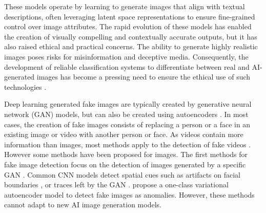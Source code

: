 These models operate by learning to generate images that align with textual descriptions, often leveraging latent space representations to ensure fine-grained control over image attributes. The rapid evolution of these models has enabled the creation of visually compelling and contextually accurate outputs, but it has also raised ethical and practical concerns. The ability to generate highly realistic images poses risks for misinformation and deceptive media. Consequently, the development of reliable classification systems to differentiate between real and AI-generated images has become a pressing need to ensure the ethical use of such technologies \cite{deandres2024frcsyn}.

Deep learning generated fake images are typically created by generative neural network (GAN) models, but can also be created using autoencoders \citep{wangCNNGeneratedImagesAre2020}. In most cases, the creation of fake images consists of replacing a person or a face in an existing image or video with another person or face.
As videos contain more information than images, most methods apply to the detection of fake videos \citep{camachoComprehensiveReviewDeepLearningBased2021}. 
However some methods have been proposed for images.
The first methods for fake image detection focus on the detection of images generated by a specific GAN \citep{marraDetectionGANGeneratedFake2018}. 
Common CNN models detect spatial cues such as artifacts on facial boundaries \citep{liFaceXRayMore2020}, or traces left by the GAN  \citep{liExposingDeepFakeVideos2018,xuanGeneralizationGANImage2019,wangCNNGeneratedImagesAre2020}.
\citet{khalidOCFakeDectClassifyingDeepfakes2020} propose a one-class variational autoencoder model to detect fake images as anomalies.
However, these methods cannot adapt to new AI image generation models.

